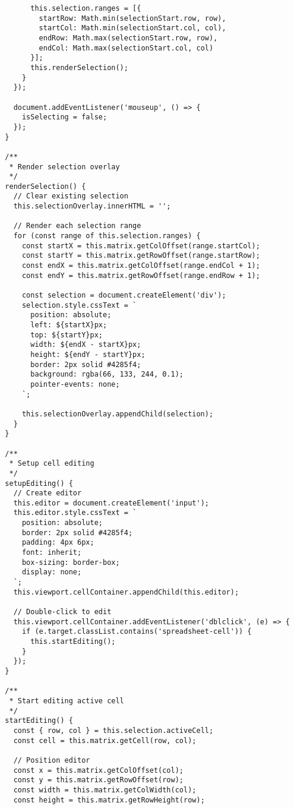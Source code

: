 \documentclass[11pt]{article}
\begin{document}
\begin{verbatim}
        this.selection.ranges = [{
          startRow: Math.min(selectionStart.row, row),
          startCol: Math.min(selectionStart.col, col),
          endRow: Math.max(selectionStart.row, row),
          endCol: Math.max(selectionStart.col, col)
        }];
        this.renderSelection();
      }
    });
    
    document.addEventListener('mouseup', () => {
      isSelecting = false;
    });
  }
  
  /**
   * Render selection overlay
   */
  renderSelection() {
    // Clear existing selection
    this.selectionOverlay.innerHTML = '';
    
    // Render each selection range
    for (const range of this.selection.ranges) {
      const startX = this.matrix.getColOffset(range.startCol);
      const startY = this.matrix.getRowOffset(range.startRow);
      const endX = this.matrix.getColOffset(range.endCol + 1);
      const endY = this.matrix.getRowOffset(range.endRow + 1);
      
      const selection = document.createElement('div');
      selection.style.cssText = `
        position: absolute;
        left: ${startX}px;
        top: ${startY}px;
        width: ${endX - startX}px;
        height: ${endY - startY}px;
        border: 2px solid #4285f4;
        background: rgba(66, 133, 244, 0.1);
        pointer-events: none;
      `;
      
      this.selectionOverlay.appendChild(selection);
    }
  }
  
  /**
   * Setup cell editing
   */
  setupEditing() {
    // Create editor
    this.editor = document.createElement('input');
    this.editor.style.cssText = `
      position: absolute;
      border: 2px solid #4285f4;
      padding: 4px 6px;
      font: inherit;
      box-sizing: border-box;
      display: none;
    `;
    this.viewport.cellContainer.appendChild(this.editor);
    
    // Double-click to edit
    this.viewport.cellContainer.addEventListener('dblclick', (e) => {
      if (e.target.classList.contains('spreadsheet-cell')) {
        this.startEditing();
      }
    });
  }
  
  /**
   * Start editing active cell
   */
  startEditing() {
    const { row, col } = this.selection.activeCell;
    const cell = this.matrix.getCell(row, col);
    
    // Position editor
    const x = this.matrix.getColOffset(col);
    const y = this.matrix.getRowOffset(row);
    const width = this.matrix.getColWidth(col);
    const height = this.matrix.getRowHeight(row);
    

\end{verbatim}
\end{document}
